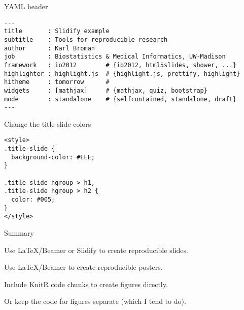 \documentclass[12pt,t]{beamer}
\begin{document}
\begin{frame}[c,fragile]{YAML header}

\begin{lstlisting}
---
title       : Slidify example
subtitle    : Tools for reproducible research
author      : Karl Broman
job         : Biostatistics & Medical Informatics, UW-Madison
framework   : io2012        # {io2012, html5slides, shower, ...}
highlighter : highlight.js  # {highlight.js, prettify, highlight}
hitheme     : tomorrow      #
widgets     : [mathjax]     # {mathjax, quiz, bootstrap}
mode        : standalone    # {selfcontained, standalone, draft}
---
\end{lstlisting}

\end{frame}



\begin{frame}[c,fragile]{Change the title slide colors}

\begin{lstlisting}
<style>
.title-slide {
  background-color: #EEE;
}

.title-slide hgroup > h1,
.title-slide hgroup > h2 {
  color: #005;
}
</style>
\end{lstlisting}

\end{frame}


\begin{frame}{Summary}

\bbi
\item Use LaTeX/Beamer or Slidify to create reproducible slides.
\item Use LaTeX/Beamer to create reproducible posters.
\item Include KnitR code chunks to create figures directly.
\item Or keep the code for figures separate (which I tend to do).
\ei

\end{frame}
\end{document}
